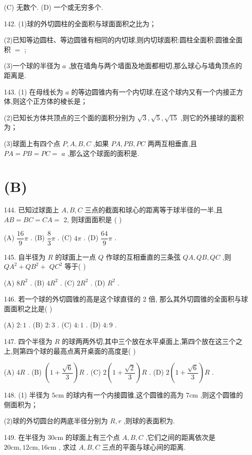 (C) 无数个. (D) 一个或无穷多个.

142. (1)球的外切圆柱的全面积与球面面积之比为\blkda{}；

(2)已知等边圆柱、等边圆锥有相同的内切球,则内切球面积:圆柱全面积:圆锥全面积 $=$ \blkda{};

(3)一个球的半径为 $a$ ,放在墙角与两个墙面及地面都相切,那么球心与墙角顶点的距离是\blkda{}.

143. (1) 在母线长为 $a$ 的等边圆锥内有一个内切球,在这个球内又有一个内接正方体,则这个正方体的棱长是\blkda{}；

(2)已知长方体共顶点的三个面的面积分别为 $\sqrt{3},\sqrt{5},\sqrt{15}$ ,则它的外接球的面积为\blkda{}；

(3)球面上有四个点 $P,A,B,C$ ,如果 ${PA},{PB},{PC}$ 两两互相垂直,且 ${PA} = {PB} = {PC} =$  $a$ ,那么这个球面的面积是\blkda{}.

\section*{(B)}

144. 已知过球面上 $A,B,C$ 三点的截面和球心的距离等于球半径的一半,且 ${AB} = {BC} = {CA} =$ 2, 则球面面积是 (   )

(A) $\dfrac{16}{9}\pi$ . (B) $\dfrac{8}{3}\pi$ . (C) ${4\pi }$ . (D) $\dfrac{64}{9}\pi$ .

145. 自半径为 $R$ 的球面上一点 $Q$ 作球的互相垂直的三条弦 ${QA},{QB},{QC}$ ,则 $Q{A}^{2} + Q{B}^{2} +$  $Q{C}^{2}$ 等于(   )

(A) $8{R}^{2}$ . (B) $4{R}^{2}$ . (C) $2{R}^{2}$ . (D) ${R}^{2}$ .

146. 若一个球的外切圆锥的高是这个球直径的 2 倍, 那么其外切圆锥的全面积与球面面积之比是(   )

(A) $2 : 1$ . (B) $2 : 3$ . (C) $4 : 1$ . (D) $4 : 9$ .

147. 四个半径为 $R$ 的球两两外切,其中三个放在水平桌面上,第四个放在这三个之上,则第四个球的最高点离开桌面的高度是(   )

(A) ${4R}$ . (B) $\left( {1 + \dfrac{\sqrt{6}}{3}}\right) R$ . (C) $2\left( {1 + \dfrac{\sqrt{2}}{3}}\right) R$ . (D) $2\left( {1 + \dfrac{\sqrt{6}}{3}}\right) R$ .

148. (1) 半径为 $5\mathrm{{cm}}$ 的球内有一个内接圆锥,这个圆锥的高为 $7\mathrm{{cm}}$ ,则这个圆锥的侧面积为\blkda{}；

(2)球的外切圆台的两底半径分别为 $R,r$ ,则球的表面积为\blkda{}.

149. 在半径为 ${30}\mathrm{{cm}}$ 的球面上有三个点 $A,B,C$ ,它们之间的距离依次是 ${20}\mathrm{{cm}},{12}\mathrm{{cm}},{16}\mathrm{{cm}}$ , 求过 $A,B,C$ 三点的平面与球心间的距离.

